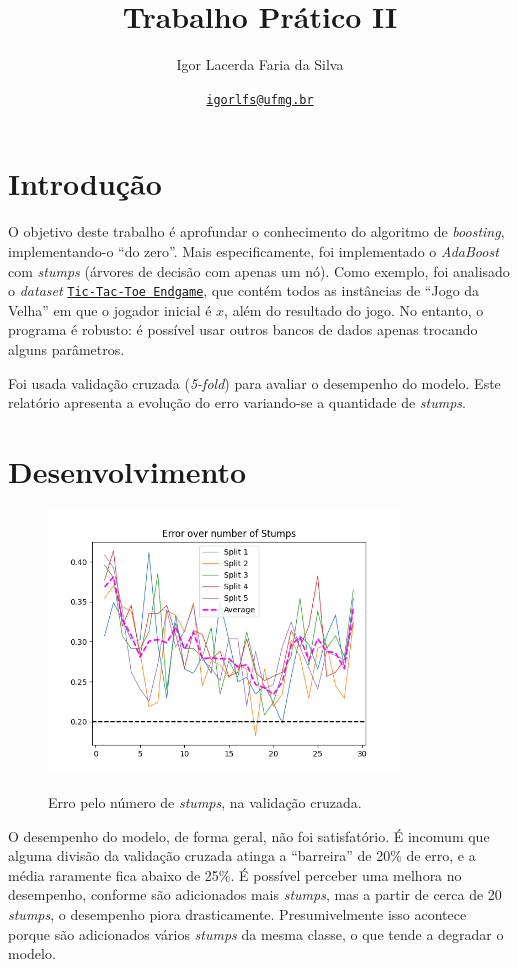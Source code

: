 \documentclass[a4paper]{article}
\title{Trabalho Prático II}
\author{Igor Lacerda Faria da Silva}
\date{\href{mailto:igorlfs@ufmg.br}{\texttt{igorlfs@ufmg.br}} }
\begin{document}
\pagestyle{fancy}

\maketitle

\section*{Introdução}
\label{sec:Introdução}

O objetivo deste trabalho é aprofundar o conhecimento do algoritmo de \textit{boosting}, implementando-o “do zero”. Mais especificamente, foi implementado o \textit{AdaBoost} com \textit{stumps} (árvores de decisão com apenas um nó). Como exemplo, foi analisado o \textit{dataset} \href{https://archive.ics.uci.edu/dataset/101/tic+tac+toe+endgame}{\texttt{Tic-Tac-Toe Endgame}}, que contém todos as instâncias de “Jogo da Velha” em que o jogador inicial é $x$, além do resultado do jogo. No entanto, o programa é robusto: é possível usar outros bancos de dados apenas trocando alguns parâmetros.

Foi usada validação cruzada (\textit{5-fold}) para avaliar o desempenho do modelo. Este relatório apresenta a evolução do erro variando-se a quantidade de \textit{stumps}.

\section*{Desenvolvimento}%
\label{sec:Desenvolvimento}

\begin{figure}[H]
	\begin{center}
		{\includegraphics[height=7cm]{./images/error_per_stumps.png}}
	\end{center}
	\caption{Erro pelo número de \textit{stumps}, na validação cruzada. \label{fig:aeh}}
\end{figure}

O desempenho do modelo, de forma geral, não foi satisfatório. É incomum que alguma divisão da validação cruzada atinga a “barreira” de 20\% de erro, e a média raramente fica abaixo de 25\%. É possível perceber uma melhora no desempenho, conforme são adicionados mais \textit{stumps}, mas a partir de cerca de 20 \textit{stumps}, o desempenho piora drasticamente. Presumivelmente isso acontece porque são adicionados vários \textit{stumps} da mesma classe, o que tende a degradar o modelo.
\end{document}
